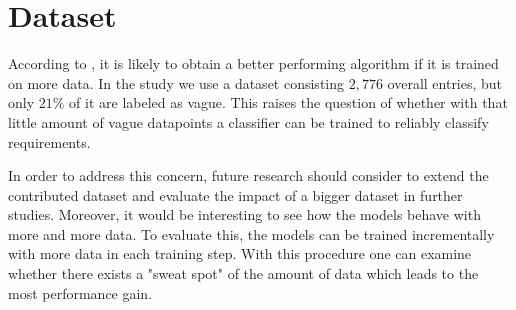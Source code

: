 \section{Dataset}
\label{chp:future_work:sec:dataset}
According to \textcite{Domingos:2012}, it is likely to obtain a better performing algorithm if it is trained on more data.
In the study we use a dataset consisting $2,776$ overall entries, but only $21\%$ of it are labeled as vague.
This raises the question of whether with that little amount of vague datapoints a classifier can be trained to reliably classify requirements.

In order to address this concern, future research should consider to extend the contributed dataset and evaluate the impact of a bigger dataset in further studies.
Moreover, it would be interesting to see how the models behave with more and more data.
To evaluate this, the models can be trained incrementally with more data in each training step.
With this procedure one can examine whether there exists a "sweat spot" of the amount of data which leads to the most performance gain.
